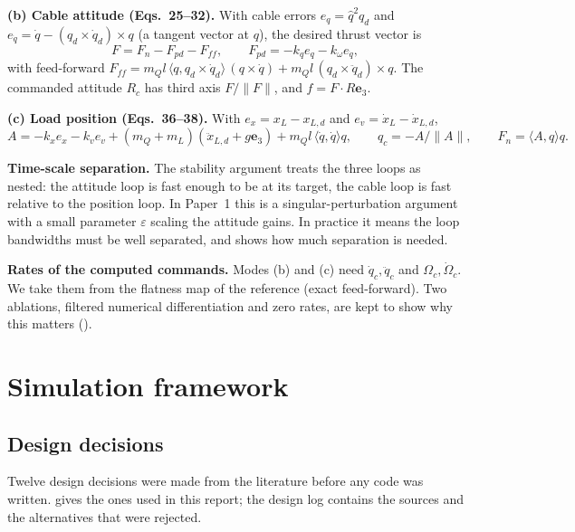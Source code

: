 \documentclass[11pt,a4paper]{article}
\newcommand{\ethree}{\mathbf{e}_3}
\begin{document}
\textbf{(b) Cable attitude (Eqs.~25--32).} With cable errors $e_q = \hat q^2 q_d$ and
$e_{\dot q} = \dot q - (q_d\times\dot q_d)\times q$ (a tangent vector at $q$), the desired thrust vector is
\begin{equation}
F = F_n - F_{pd} - F_{ff},\qquad F_{pd} = -k_q e_q - k_\omega e_{\dot q},
\end{equation}
with feed-forward $F_{ff}= m_Q l\,\langle q, q_d\times\dot q_d\rangle\,(q\times\dot q) + m_Q l\,(q_d\times\ddot q_d)\times q$.
The commanded attitude $R_c$ has third axis $F/\|F\|$, and $f = F\cdot R\ethree$.

\textbf{(c) Load position (Eqs.~36--38).} With $e_x = x_L - x_{L,d}$ and $e_v = \dot x_L - \dot x_{L,d}$,
\begin{equation}
A = -k_x e_x - k_v e_v + (m_Q+m_L)(\ddot x_{L,d} + g\ethree) + m_Q l\,\langle\dot q,\dot q\rangle q,\qquad
q_c = -A/\|A\|,\qquad F_n = \langle A, q\rangle q .
\end{equation}

\textbf{Time-scale separation.} The stability argument treats the three loops as nested: the attitude loop is fast enough
to be at its target, the cable loop is fast relative to the position loop. In Paper~1 this is a singular-perturbation
argument with a small parameter $\varepsilon$ scaling the attitude gains. In practice it means the loop bandwidths must
be well separated, and  shows how much separation is needed.

\textbf{Rates of the computed commands.} Modes (b) and (c) need $\dot q_c, \ddot q_c$ and $\Omega_c, \dot\Omega_c$. We
take them from the flatness map of the reference (exact feed-forward). Two ablations, filtered numerical
differentiation and zero rates, are kept to show why this matters ().

\section{Simulation framework}
\label{sec:framework}

\subsection{Design decisions}
Twelve design decisions were made from the literature before any code was written.  gives the ones
used in this report; the design log contains the sources and the alternatives that were rejected.
\end{document}
